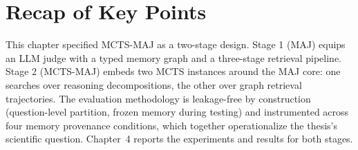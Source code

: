 \documentclass[12pt,a4paper]{report}
\begin{document}
\section{Recap of Key Points}

This chapter specified MCTS-MAJ as a two-stage design. Stage 1 (MAJ) equips an LLM judge with a typed memory graph and a three-stage retrieval pipeline. Stage 2 (MCTS-MAJ) embeds two MCTS instances around the MAJ core: one searches over reasoning decompositions, the other over graph retrieval trajectories. The evaluation methodology is leakage-free by construction (question-level partition, frozen memory during testing) and instrumented across four memory provenance conditions, which together operationalize the thesis's scientific question. Chapter~4 reports the experiments and results for both stages.



\end{document}

